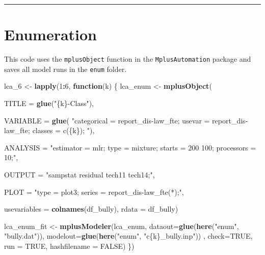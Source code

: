 \documentclass[
]{book}
\newenvironment{Shaded}{\begin{snugshade}}{\end{snugshade}}
\newcommand{\AttributeTok}[1]{\textcolor[rgb]{0.13,0.29,0.53}{#1}}
\newcommand{\ConstantTok}[1]{\textcolor[rgb]{0.56,0.35,0.01}{#1}}
\newcommand{\ControlFlowTok}[1]{\textcolor[rgb]{0.13,0.29,0.53}{\textbf{#1}}}
\newcommand{\DecValTok}[1]{\textcolor[rgb]{0.00,0.00,0.81}{#1}}
\newcommand{\FunctionTok}[1]{\textcolor[rgb]{0.13,0.29,0.53}{\textbf{#1}}}
\newcommand{\NormalTok}[1]{#1}
\newcommand{\OtherTok}[1]{\textcolor[rgb]{0.56,0.35,0.01}{#1}}
\newcommand{\SpecialCharTok}[1]{\textcolor[rgb]{0.81,0.36,0.00}{\textbf{#1}}}
\newcommand{\StringTok}[1]{\textcolor[rgb]{0.31,0.60,0.02}{#1}}
\begin{document}
\begin{center}\rule{0.5\linewidth}{0.5pt}\end{center}

\section{Enumeration}\label{enumeration}

This code uses the \texttt{mplusObject} function in the \texttt{MplusAutomation} package and saves all model runs in the \texttt{enum} folder.

\begin{Shaded}
\begin{Highlighting}[]

\NormalTok{lca\_6  }\OtherTok{\textless{}{-}} \FunctionTok{lapply}\NormalTok{(}\DecValTok{1}\SpecialCharTok{:}\DecValTok{6}\NormalTok{, }\ControlFlowTok{function}\NormalTok{(k) \{}
\NormalTok{  lca\_enum  }\OtherTok{\textless{}{-}} \FunctionTok{mplusObject}\NormalTok{(}
      
    \AttributeTok{TITLE =} \FunctionTok{glue}\NormalTok{(}\StringTok{"\{k\}{-}Class"}\NormalTok{), }
  
    \AttributeTok{VARIABLE =} \FunctionTok{glue}\NormalTok{(}
    \StringTok{"categorical = report\_dis{-}law\_fte; }
\StringTok{     usevar = report\_dis{-}law\_fte;}
\StringTok{     classes = c(\{k\}); "}\NormalTok{),}
  
  \AttributeTok{ANALYSIS =} 
   \StringTok{"estimator = mlr; }
\StringTok{    type = mixture;}
\StringTok{    starts = 200 100; }
\StringTok{    processors = 10;"}\NormalTok{,}
  
  \AttributeTok{OUTPUT =} \StringTok{"sampstat residual tech11 tech14;"}\NormalTok{,}
  
  \AttributeTok{PLOT =} 
    \StringTok{"type = plot3; }
\StringTok{    series = report\_dis{-}law\_fte(*);"}\NormalTok{,}
  
  \AttributeTok{usevariables =} \FunctionTok{colnames}\NormalTok{(df\_bully),}
  \AttributeTok{rdata =}\NormalTok{ df\_bully)}

\NormalTok{lca\_enum\_fit }\OtherTok{\textless{}{-}} \FunctionTok{mplusModeler}\NormalTok{(lca\_enum, }
                            \AttributeTok{dataout=}\FunctionTok{glue}\NormalTok{(}\FunctionTok{here}\NormalTok{(}\StringTok{"enum"}\NormalTok{, }\StringTok{"bully.dat"}\NormalTok{)),}
                            \AttributeTok{modelout=}\FunctionTok{glue}\NormalTok{(}\FunctionTok{here}\NormalTok{(}\StringTok{"enum"}\NormalTok{, }\StringTok{"c\{k\}\_bully.inp"}\NormalTok{)) ,}
                            \AttributeTok{check=}\ConstantTok{TRUE}\NormalTok{, }\AttributeTok{run =} \ConstantTok{TRUE}\NormalTok{, }\AttributeTok{hashfilename =} \ConstantTok{FALSE}\NormalTok{)}
\NormalTok{\})}
\end{Highlighting}
\end{Shaded}
\end{document}
